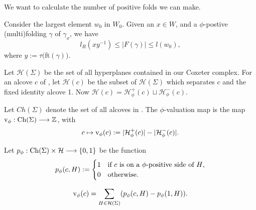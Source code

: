 \documentclass[11pt]{article}
\begin{document}
We want to calculate the number of positive folds we can make.

\begin{proposition}
    Consider the largest element $w_0$ in $W_0$. Given an $x\in W$, and a $\phi$-postive (multi)folding $\gamma$ of $\gamma_x$, we have
    \[l_R(xy^{-1})\leq |F(\gamma)|\leq l(w_0),\]
    where $y:=\tau($ft$(\gamma))$.
\end{proposition}

\begin{definition}
    Let $\mathcal{H}(\Sigma)$ be the set of all hyperplanes contained in our Coxeter complex. For an alcove $c$ of \sg, let $\mathcal{H}(c)$ be the subset of $\mathcal{H}(\Sigma)$ which separates $c$ and the fixed identity alcove 1. Now $\mathcal{H}(c)=\mathcal{H}_{\phi}^+(c)\sqcup \mathcal{H}_{\phi}^-(c)$. 
\end{definition}


\begin{definition}
    Let $Ch(\Sigma)$ denote the set of all alcoves in \sg. The $\phi$-valuation map is the map $\textnormal{v}_\phi:\textnormal{Ch}(\Sigma)\longrightarrow\mathbb{Z}$, with
    \[c\mapsto \textnormal{v}_\phi(c):= |\mathcal{H}_{\phi}^+(c)|-|\mathcal{H}_{\phi}^-(c)|.\]
\end{definition}

\begin{definition}
    Let $p_\phi : \textnormal{Ch}(\Sigma)\times \mathcal{H}\longrightarrow \{0,1\}$ be the function 
    \[p_\phi(c,H):= \begin{cases}
        1 & \textnormal{if $c$ is on a $\phi$-positive side of $H$,}\\
        0 & \textnormal{otherwise.}
    \end{cases}\]
\end{definition}

\begin{lemma}
    \[\textnormal{v}_\phi(c)=\sum_{H\in\mathcal{H}(\Sigma)}(p_{\phi}(c,H)-p_\phi(1,H)).\]
\end{lemma}
\end{document}
